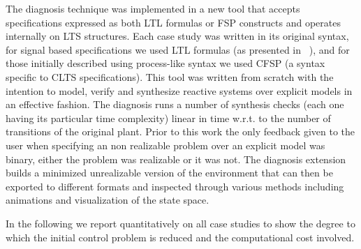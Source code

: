 \vspace{-1em}
The diagnosis technique was implemented in a new tool that accepts specifications expressed as both LTL formulas or FSP constructs and operates internally on LTS structures. Each case study was written in its original syntax, for signal based specifications we used LTL formulas (as presented in ~\cite{Bloem:2012}), and for those initially described using process-like syntax we used CFSP (a syntax specific to CLTS specifications). This tool was written from scratch with the intention to model, verify and synthesize reactive systems over explicit models in an effective fashion. 
The diagnosis runs a number of synthesis checks (each one having its particular time complexity) linear in time w.r.t. to the number of transitions of the original plant.
Prior to this work the only feedback given to the user  when specifying an non realizable problem over an explicit model was binary, either the problem was realizable or it was not.
The diagnosis extension builds a minimized unrealizable version of the environment that can then be exported to different formats and inspected through various methods including animations and visualization of the state space.

In the following we report quantitatively on all case studies to show the degree to which the initial control problem is reduced and the computational cost involved. 

